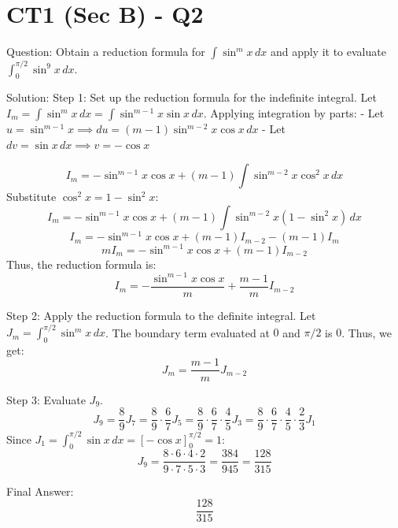 \documentclass{article}
\begin{document}
\section*{CT1 (Sec B) - Q2}
Question:
Obtain a reduction formula for \(\int \sin^m x \, dx\) and apply it to evaluate \(\int_0^{\pi/2} \sin^9 x \, dx\).

Solution:
Step 1: Set up the reduction formula for the indefinite integral.
Let \(I_m = \int \sin^m x \, dx = \int \sin^{m-1} x \sin x \, dx\).
Applying integration by parts:
- Let \(u = \sin^{m-1} x \implies du = (m-1)\sin^{m-2} x \cos x \, dx\)
- Let \(dv = \sin x \, dx \implies v = -\cos x\)

\[
I_m = -\sin^{m-1} x \cos x + (m-1) \int \sin^{m-2} x \cos^2 x \, dx
\]
Substitute \(\cos^2 x = 1 - \sin^2 x\):
\[
I_m = -\sin^{m-1} x \cos x + (m-1) \int \sin^{m-2} x (1 - \sin^2 x) \, dx
\]
\[
I_m = -\sin^{m-1} x \cos x + (m-1) I_{m-2} - (m-1) I_m
\]
\[
m I_m = -\sin^{m-1} x \cos x + (m-1) I_{m-2}
\]
Thus, the reduction formula is:
\[
I_m = -\frac{\sin^{m-1} x \cos x}{m} + \frac{m-1}{m} I_{m-2}
\]

Step 2: Apply the reduction formula to the definite integral.
Let \(J_m = \int_0^{\pi/2} \sin^m x \, dx\). The boundary term evaluated at \(0\) and \(\pi/2\) is \(0\). Thus, we get:
\[
J_m = \frac{m-1}{m} J_{m-2}
\]

Step 3: Evaluate \(J_9\).
\[
J_9 = \frac{8}{9} J_7 = \frac{8}{9} \cdot \frac{6}{7} J_5 = \frac{8}{9} \cdot \frac{6}{7} \cdot \frac{4}{5} J_3 = \frac{8}{9} \cdot \frac{6}{7} \cdot \frac{4}{5} \cdot \frac{2}{3} J_1
\]
Since \(J_1 = \int_0^{\pi/2} \sin x \, dx = [-\cos x]_0^{\pi/2} = 1\):
\[
J_9 = \frac{8 \cdot 6 \cdot 4 \cdot 2}{9 \cdot 7 \cdot 5 \cdot 3} = \frac{384}{945} = \frac{128}{315}
\]

Final Answer:
\[
\boxed{\frac{128}{315}}
\]

\end{document}
